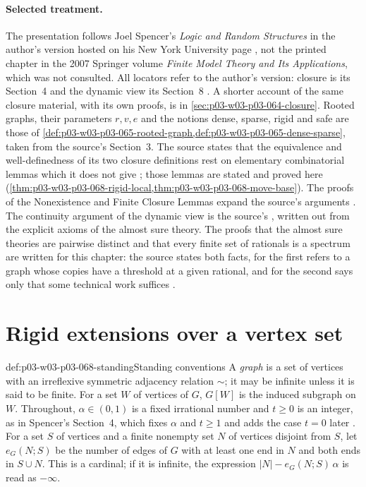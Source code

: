 \paragraph{Selected treatment.}
The presentation follows Joel Spencer's \emph{Logic and Random Structures}
in the author's version hosted on his New York University page
\cite{Spencer2007LogicRandomStructuresAuthor}, not the printed chapter in the 2007 Springer
volume \emph{Finite Model Theory and Its Applications}, which was not
consulted.  All locators refer to the author's version: closure is its Section~4
\cite[pp.~8--9]{Spencer2007LogicRandomStructuresAuthor} and the dynamic view its Section~8
\cite[pp.~15--16]{Spencer2007LogicRandomStructuresAuthor}.  A shorter
account of the same closure material, with its own proofs, is in
\cref{sec:p03-w03-p03-064-closure}.  Rooted graphs, their parameters
\(r,v,e\) and the notions dense, sparse, rigid and safe are those of
\cref{def:p03-w03-p03-065-rooted-graph,def:p03-w03-p03-065-dense-sparse},
taken from the source's Section~3.  The source states that the
equivalence and well-definedness of its two closure definitions rest on
elementary combinatorial lemmas which it does not give
\cite[p.~8]{Spencer2007LogicRandomStructuresAuthor}; those lemmas are stated and proved
here (\cref{thm:p03-w03-p03-068-rigid-local,thm:p03-w03-p03-068-move-base}).
The proofs of the Nonexistence and Finite Closure Lemmas expand the
source's arguments \cite[pp.~8--9]{Spencer2007LogicRandomStructuresAuthor}.  The
continuity argument of the dynamic view is the source's
\cite[p.~15]{Spencer2007LogicRandomStructuresAuthor}, written out from the explicit axioms
of the almost sure theory.  The proofs that the almost sure theories are
pairwise distinct and that every finite set of rationals is a spectrum are
written for this chapter: the source states both facts, for the first
refers to a graph whose copies have a threshold at a given rational, and for
the second says only that some technical work suffices
\cite[pp.~15--16]{Spencer2007LogicRandomStructuresAuthor}.

\section{Rigid extensions over a vertex set}
\label{sec:p03-w03-p03-068-rigid}

\begin{hbconvention}{def:p03-w03-p03-068-standing}{Standing conventions}
A \emph{graph} is a set of vertices with an irreflexive symmetric adjacency
relation \(\sim\); it may be infinite unless it is said to be finite.  For a
set \(W\) of vertices of \(G\), \(G[W]\) is the induced subgraph on \(W\).
Throughout, \(\alpha\in(0,1)\) is a fixed irrational number and \(t\geq0\)
is an integer, as in Spencer's Section~4, which fixes \(\alpha\) and
\(t\geq1\) and adds the case \(t=0\) later
\cite[pp.~8--9]{Spencer2007LogicRandomStructuresAuthor}.  For a set \(S\) of vertices and a
finite nonempty set \(N\) of vertices disjoint from \(S\), let
\(e_G(N;S)\) be the number of edges of \(G\) with at least one end in \(N\)
and both ends in \(S\cup N\).  This is a cardinal; if it is infinite, the
expression \(|N|-e_G(N;S)\,\alpha\) is read as \(-\infty\).
\end{hbconvention}


